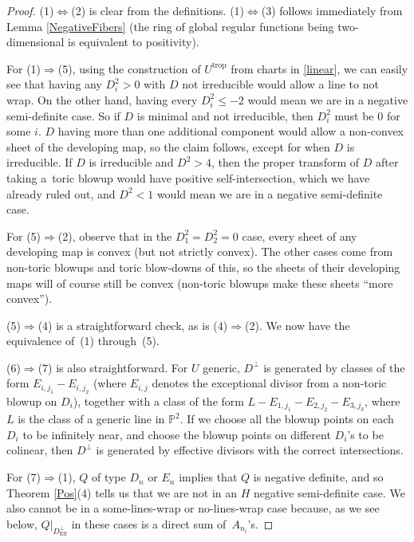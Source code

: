 \documentclass[pdftex]{sigma}
\numberwithin{equation}{section}
\numberwithin{figure}{section}
\numberwithin{table}{section}
\DeclareMathOperator{\trop}{trop}
\DeclareMathOperator{\Eff}{Eff}
\let\bb=\mathbb
\theoremstyle{definition}
\begin{document}
\begin{proof}(1)$\Leftrightarrow$(2) is clear from the definitions. (1)$\Leftrightarrow$(3) follows immediately from Lemma \ref{NegativeFibers} (the ring of global regular functions being two-dimensional is equivalent to positivity).

For (1)$\Rightarrow$(5), using the construction of $U^{\trop}$ from charts in \eqref{linear}, we can easily see that having any $D_i^2>0$ with $D$ not irreducible would allow a line to not wrap. On the other hand, having every $D_i^2 \leq -2$ would mean we are in a negative semi-definite case. So if $D$ is minimal and not irreducible, then $D_i^2$ must be $0$ for some $i$. $D$ having more than one additional component would allow a non-convex sheet of the developing map, so the claim follows, except for when $D$ is irreducible. If $D$ is irreducible and $D^2 > 4$, then the proper transform of $D$ after taking a~toric blowup would have positive self-intersection, which we have already ruled out, and $D^2<1$ would mean we are in a negative semi-definite case.

For (5)$\Rightarrow$(2), observe that in the $D_1^2=D_2^2=0$ case, every sheet of any developing map is convex (but not strictly convex). The other cases come from non-toric blowups and toric blow-downs of this, so the sheets of their developing maps will of course still be convex (non-toric blowups make these sheets ``more convex'').

(5)$\Rightarrow$(4) is a straightforward check, as is (4)$\Rightarrow$(2). We now have the equivalence of~(1) through~(5).

(6)$\Rightarrow$(7) is also straightforward. For $U$ generic, $D^{\perp}$ is generated by classes of the form $E_{i,j_1}-E_{i,j_2}$ (where $E_{i,j}$ denotes the exceptional divisor from a non-toric blowup on $D_i$), together with a class of the form $L-E_{1,j_1} - E_{2,j_2} - E_{3,j_3}$, where $L$ is the class of a generic line in $\bb{P}^2$. If we choose all the blowup points on each $D_i$ to be infinitely near, and choose the blowup points on different $D_i$'s to be colinear, then $D^{\perp}$ is generated by effective divisors with the correct intersections.

For (7)$\Rightarrow$(1), $Q$ of type $D_n$ or $E_n$ implies that $Q$ is negative definite, and so Theorem \ref{Pos}(4) tells us that we are not in an $H$ negative semi-definite case. We also cannot be in a some-lines-wrap or no-lines-wrap case because, as we see below, $Q|_{D^{\perp}_{\Eff}}$ in these cases is a direct sum of~$A_{n_i}$'s.


\end{proof}
\end{document}
